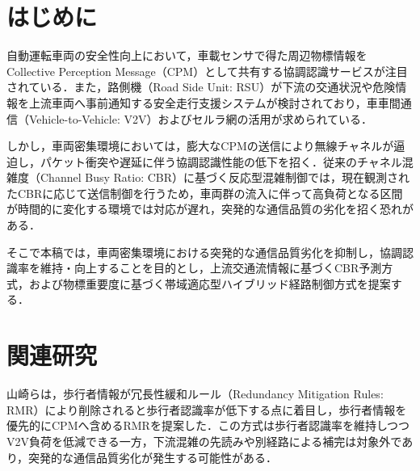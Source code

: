 \documentclass{fitj}
\begin{document}
\maketitle




\section{はじめに}
自動運転車両の安全性向上において，車載センサで得た周辺物標情報をCollective Perception Message（CPM）として共有する協調認識サービスが注目されている．また，路側機（Road Side Unit: RSU）が下流の交通状況や危険情報を上流車両へ事前通知する安全走行支援システムが検討されており\cite{soumu2025}，車車間通信（Vehicle-to-Vehicle: V2V）およびセルラ網の活用が求められている． 

しかし，車両密集環境においては，膨大なCPMの送信により無線チャネルが逼迫し，パケット衝突や遅延に伴う協調認識性能の低下を招く．従来のチャネル混雑度（Channel Busy Ratio: CBR）に基づく反応型混雑制御では，現在観測されたCBRに応じて送信制御を行うため\cite{etsidcc}，車両群の流入に伴って高負荷となる区間が時間的に変化する環境では対応が遅れ，突発的な通信品質の劣化を招く恐れがある．

そこで本稿では，車両密集環境における突発的な通信品質劣化を抑制し，協調認識率を維持・向上することを目的とし，上流交通流情報に基づくCBR予測方式，および物標重要度に基づく帯域適応型ハイブリッド経路制御方式を提案する．

\section{関連研究}
山崎らは，歩行者情報が冗長性緩和ルール（Redundancy Mitigation Rules: RMR）により削除されると歩行者認識率が低下する点に着目し，歩行者情報を優先的にCPMへ含めるRMRを提案した\cite{yamasaki2023}．この方式は歩行者認識率を維持しつつV2V負荷を低減できる一方，下流混雑の先読みや別経路による補完は対象外であり，突発的な通信品質劣化が発生する可能性がある．
\end{document}
